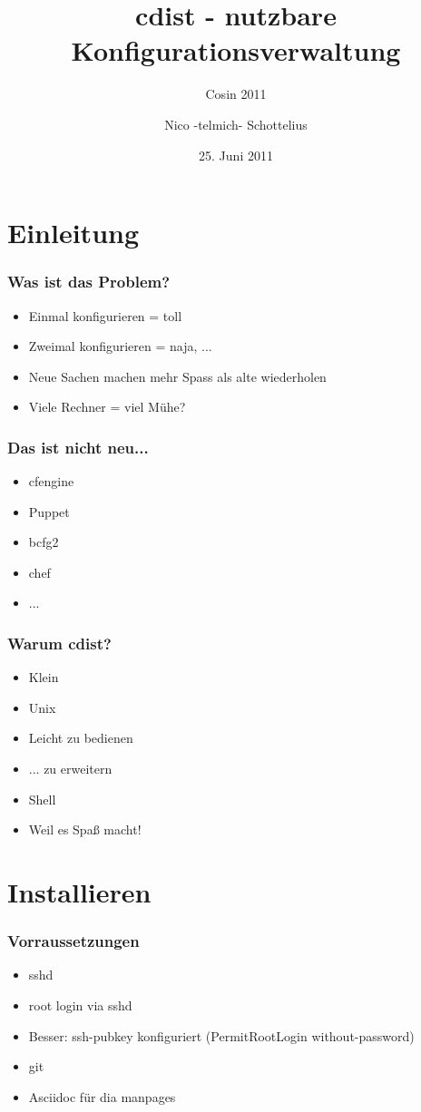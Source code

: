 \documentclass{beamer}
\title{cdist - nutzbare Konfigurationsverwaltung}
\subtitle{Cosin 2011}
\author{Nico -telmich- Schottelius}
\date{25. Juni 2011}
\begin{document}
\frame{\titlepage}

\frame{\tableofcontents}

\section{Einleitung}
\frame
{
  \frametitle{Was ist das Problem?}
  \begin{itemize}
  \item Einmal konfigurieren = toll
  \item Zweimal konfigurieren = naja, ...
  \item Neue Sachen machen mehr Spass als alte wiederholen
  \item Viele Rechner = viel Mühe?
  \end{itemize}
}

\frame
{
  \frametitle{Das ist nicht neu...}
  \begin{itemize}
  \item cfengine
  \item Puppet
  \item bcfg2
  \item chef
  \item ...
  \end{itemize}
}

\frame
{
  \frametitle{Warum cdist?}
  \begin{itemize}
     \item Klein
     \item Unix
     \item Leicht zu bedienen
     \item ... zu erweitern
     \item Shell
     \item Weil es Spaß macht!
  \end{itemize}
}

\section{Installieren}
\frame
{
  \frametitle{Vorraussetzungen}
  \begin{itemize}
     \item sshd
     \item root login via sshd
     \item Besser: ssh-pubkey konfiguriert (PermitRootLogin without-password)
     \item git
     \item Asciidoc für dia manpages
  \end{itemize}
}
\end{document}
